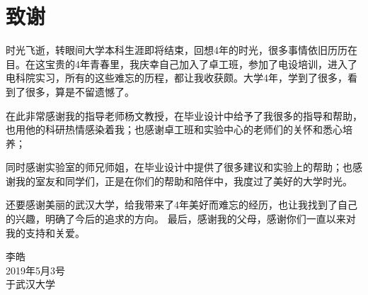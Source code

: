 
\clearpage
{}
{}

\chapter*{致谢}
时光飞逝，转眼间大学本科生涯即将结束，回想4年的时光，很多事情依旧历历在目。在这宝贵的4年青春里，我庆幸自己加入了卓工班，参加了电设培训，进入了电科院实习，所有的这些难忘的历程，都让我收获颇。大学4年，学到了很多，看到了很多，算是不留遗憾了。

在此非常感谢我的指导老师杨文教授，在毕业设计中给予了我很多的指导和帮助，也用他的科研热情感染着我；也感谢卓工班和实验中心的老师们的关怀和悉心培养；

同时感谢实验室的师兄师姐，在毕业设计中提供了很多建议和实验上的帮助；也感谢我的室友和同学们，正是在你们的帮助和陪伴中，我度过了美好的大学时光。

还要感谢美丽的武汉大学，给我带来了4年美好而难忘的经历，也让我找到了自己的兴趣，明确了今后的追求的方向。
最后，感谢我的父母，感谢你们一直以来对我的支持和关爱。

\begin{flushright}
	李皓 \\
	2019年5月3号 \\
	于武汉大学	
\end{flushright}